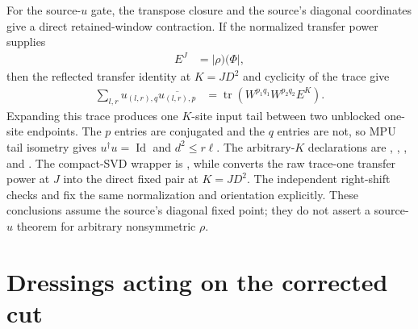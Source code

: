 \documentclass{article}
\begin{document}
For the source-$u$ gate, the transpose closure and the source's diagonal
coordinates give a direct retained-window contraction. If the normalized
transfer power supplies
\begin{align}
    E^J & =\lvert\rho)(\Phi\rvert,
    \label{eq:mpu_source_cut_orientation_1}
\end{align}
then the reflected transfer identity at $K=JD^2$ and cyclicity of the trace
give
\begin{align}
    \sum_{l,r}u_{(l,r),q}\overline{u_{(l,r),p}}
     & =\operatorname{tr}\!\left(
       W^{p_1q_1}W^{p_2q_2}E^K
       \right).
    \label{eq:mpu_source_cut_orientation_direct_closure}
\end{align}
Expanding this trace produces one $K$-site input tail between two unblocked
one-site endpoints. The $p$ entries are conjugated and the $q$ entries are not,
so MPU tail isometry gives $u^\dagger u=\operatorname{Id}$ and $d^2\le r\ell$.
The arbitrary-$K$ declarations are
,
,
, and
.
The compact-SVD wrapper is
, while
converts the raw trace-one transfer power at $J$ into the direct fixed pair at
$K=JD^2$. The independent right-shift checks
 and
 fix the same
normalization and orientation explicitly. These conclusions assume the
source's diagonal fixed point; they do not assert a source-$u$ theorem for
arbitrary nonsymmetric $\rho$.

\section{Dressings acting on the corrected cut}
\end{document}
